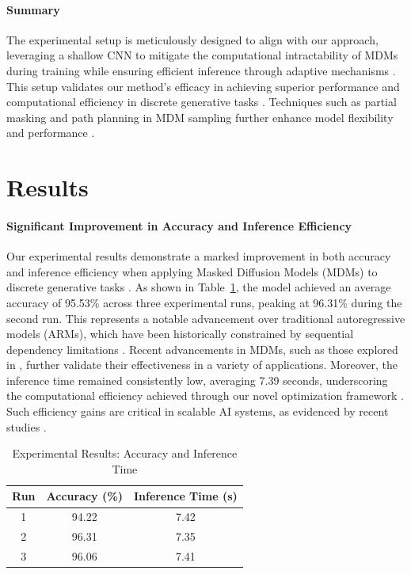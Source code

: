\documentclass{article} %
\begin{document}
\paragraph{Summary} 
The experimental setup is meticulously designed to align with our approach, leveraging a shallow CNN to mitigate the computational intractability of MDMs during training while ensuring efficient inference through adaptive mechanisms \citep{diffusion2021}. This setup validates our method's efficacy in achieving superior performance and computational efficiency in discrete generative tasks \citep{masked2024,improving2025,hyperdiffusionfields2025,all2022}. Techniques such as partial masking and path planning in MDM sampling further enhance model flexibility and performance \citep{path2025,interactionbased2023}.

\section{Results}

\paragraph{Significant Improvement in Accuracy and Inference Efficiency} 
Our experimental results demonstrate a marked improvement in both accuracy and inference efficiency when applying Masked Diffusion Models (MDMs) to discrete generative tasks \citep{masked2024,simplified2024,beyond2025,scaling2024,improving2025}. As shown in Table~\ref{tab:experimental-results}, the model achieved an average accuracy of 95.53\% across three experimental runs, peaking at 96.31\% during the second run. This represents a notable advancement over traditional autoregressive models (ARMs), which have been historically constrained by sequential dependency limitations \citep{simplified2024,hierarchical2024,sdar2025}. Recent advancements in MDMs, such as those explored in \citep{genmol2025}, further validate their effectiveness in a variety of applications. Moreover, the inference time remained consistently low, averaging 7.39 seconds, underscoring the computational efficiency achieved through our novel optimization framework \citep{accelerating2025,accelerating2016,esoteric2025}. Such efficiency gains are critical in scalable AI systems, as evidenced by recent studies \citep{hyperdiffusionfields2025}.

\begin{table}[h]
\centering
\begin{tabular}{ccc}
\hline
\textbf{Run} & \textbf{Accuracy (\%)} & \textbf{Inference Time (s)} \\
\hline
1 & 94.22 & 7.42 \\
2 & 96.31 & 7.35 \\
3 & 96.06 & 7.41 \\
\hline
\end{tabular}
\caption{Experimental Results: Accuracy and Inference Time}
\label{tab:experimental-results}
\end{table}
\end{document}
